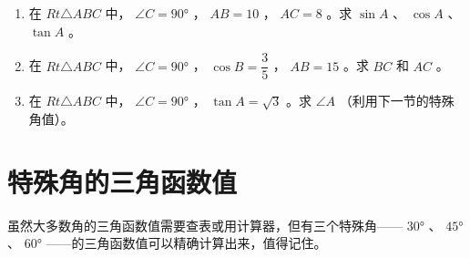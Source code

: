 \begin{practice}


\begin{enumerate}
  \item 在 $Rt\triangle ABC$ 中， $\angle C = 90°$ ， $AB = 10$ ， $AC = 8$ 。求 $\sin A$ 、 $\cos A$ 、 $\tan A$ 。
  \item 在 $Rt\triangle ABC$ 中， $\angle C = 90°$ ， $\cos B = \dfrac{3}{5}$ ， $AB = 15$ 。求 $BC$ 和 $AC$ 。
  \item 在 $Rt\triangle ABC$ 中， $\angle C = 90°$ ， $\tan A = \sqrt{3}$ 。求 $\angle A$ （利用下一节的特殊角值）。
\end{enumerate}


\end{practice}



\section*{特殊角的三角函数值}


\begin{explore}


虽然大多数角的三角函数值需要查表或用计算器，但有三个特殊角—— $30°$ 、 $45°$ 、 $60°$ ——的三角函数值可以精确计算出来，值得记住。

\end{explore}

